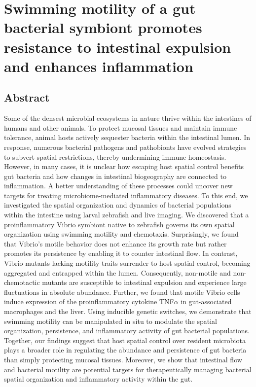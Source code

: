 \chapter{Swimming motility of a gut bacterial symbiont promotes resistance to intestinal expulsion and enhances inflammation}




\section{Abstract}
Some of the densest microbial ecosystems in nature thrive within the intestines of humans and other animals. To protect mucosal tissues and maintain immune tolerance, animal hosts actively sequester bacteria within the intestinal lumen. In response, numerous bacterial pathogens and pathobionts have evolved strategies to subvert spatial restrictions, thereby undermining immune homeostasis. However, in many cases, it is unclear how escaping host spatial control benefits gut bacteria and how changes in intestinal biogeography are connected to inflammation. A better understanding of these processes could uncover new targets for treating microbiome-mediated inflammatory diseases. To this end, we investigated the spatial organization and dynamics of bacterial populations within the intestine using larval zebrafish and live imaging. We discovered that a proinflammatory Vibrio symbiont native to zebrafish governs its own spatial organization using swimming motility and chemotaxis. Surprisingly, we found that Vibrio's motile behavior does not enhance its growth rate but rather promotes its persistence by enabling it to counter intestinal flow. In contrast, Vibrio mutants lacking motility traits surrender to host spatial control, becoming aggregated and entrapped within the lumen. Consequently, non-motile and non-chemotactic mutants are susceptible to intestinal expulsion and experience large fluctuations in absolute abundance. Further, we found that motile Vibrio cells induce expression of the proinflammatory cytokine TNF$\alpha$ in gut-associated macrophages and the liver. Using inducible genetic switches, we demonstrate that swimming motility can be manipulated in situ to modulate the spatial organization, persistence, and inflammatory activity of gut bacterial populations. Together, our findings suggest that host spatial control over resident microbiota plays a broader role in regulating the abundance and persistence of gut bacteria than simply protecting mucosal tissues. Moreover, we show that intestinal flow and bacterial motility are potential targets for therapeutically managing bacterial spatial organization and inflammatory activity within the gut.

